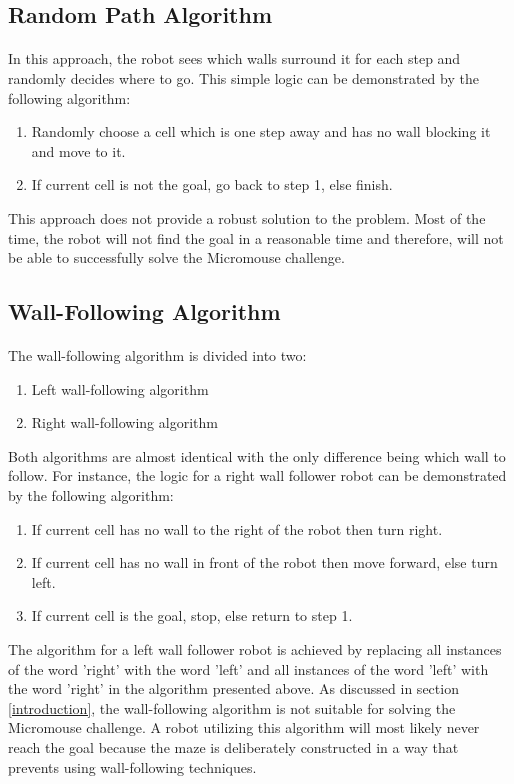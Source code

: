 \documentclass[12pt]{article}
\begin{document}
\subsection{Random Path Algorithm} \label{Random Algorithm}
\paragraph{}
In this approach, the robot sees which walls surround it for each step and randomly decides where to go.
This simple logic can be demonstrated by the following algorithm:
\begin{enumerate}
    \item Randomly choose a \gls{cell} which is one step away and has no wall blocking it and move to it.
    \item If current \gls{cell} is not the goal, go back to step 1, else finish.
\end{enumerate}
This approach does not provide a robust solution to the problem.
Most of the time, the robot will not find the goal in a reasonable time and therefore, will not be able to successfully solve the \gls{Micromouse} challenge.

\subsection{Wall-Following Algorithm} \label{Wall Following Algorithm}
\paragraph{}
The wall-following algorithm is divided into two:
\begin{enumerate}
    \item Left wall-following algorithm
    \item Right wall-following algorithm
\end{enumerate}
Both algorithms are almost identical with the only difference being which wall to follow.
For instance, the logic for a right wall follower robot can be demonstrated by the following algorithm:
\begin{enumerate}
    \item If current \gls{cell} has no wall to the right of the robot then turn right.
    \item If current \gls{cell} has no wall in front of the robot then move forward, else turn left.
    \item If current \gls{cell} is the goal, stop, else return to step 1.
\end{enumerate}
The algorithm for a left wall follower robot is achieved by replacing all instances of the word 'right' with the word 'left' and all instances of the word 'left' with the word 'right' in the algorithm presented above.
As discussed in section \ref{introduction}, the wall-following algorithm is not suitable for solving the \gls{Micromouse} challenge. A robot utilizing this algorithm will most likely never reach the goal because the \gls{maze} is deliberately constructed in a way that prevents using wall-following techniques.
\end{document}
